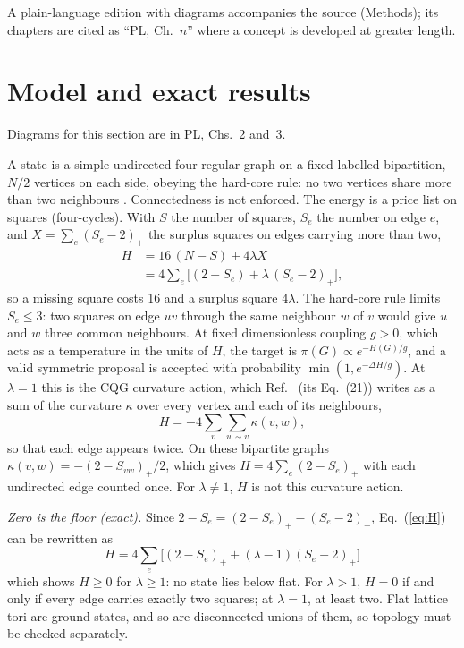 \documentclass[aps,pre,10pt,twocolumn,superscriptaddress,nofootinbib]{revtex4-2}
\begin{document}
A plain-language edition with diagrams accompanies the source (Methods); its chapters are cited as
``PL, Ch.~$n$'' where a concept is developed at greater length.

\section{Model and exact results}
\label{sec:model}

Diagrams for this section are in PL, Chs.~2 and~3.

A state is a simple undirected four-regular graph on a fixed labelled bipartition, $N/2$ vertices on
each side, obeying the hard-core rule: no two vertices share more than two neighbours
\cite{KTB19,T25}. Connectedness is not enforced. The energy is a price list on squares (four-cycles).
With $S$ the number of squares, $S_e$ the number on edge $e$, and $X=\sum_e(S_e-2)_+$ the surplus
squares on edges carrying more than two,
\begin{equation}
\begin{aligned}
H &= 16\,(N - S) + 4\lambda X\\
  &= 4 \sum_e \bigl[(2 - S_e) + \lambda\,(S_e - 2)_+\bigr],
\end{aligned}
\label{eq:H}
\end{equation}
so a missing square costs 16 and a surplus square $4\lambda$. The hard-core rule limits $S_e\le3$: two
squares on edge $uv$ through the same neighbour $w$ of $v$ would give $u$ and $w$ three common neighbours.
At fixed dimensionless coupling $g>0$, which acts as a temperature in the units of $H$, the target is
$\pi(G)\propto e^{-H(G)/g}$, and a valid symmetric proposal is accepted with probability
$\min(1,e^{-\Delta H/g})$. At $\lambda=1$ this is the CQG curvature action, which Ref.~\cite{T25}
(its Eq.~(21)) writes as a sum of the curvature $\kappa$ over every vertex and each of its neighbours,
\[
H=-4\sum_v\sum_{w\sim v}\kappa(v,w),
\]
so that each edge appears twice. On these bipartite graphs $\kappa(v,w)=-(2-S_{vw})_+/2$, which gives
$H=4\sum_e(2-S_e)_+$ with each undirected edge counted once. For $\lambda\ne1$, $H$ is not this
curvature action.

\emph{Zero is the floor (exact).} Since $2-S_e=(2-S_e)_+-(S_e-2)_+$, Eq.~(\ref{eq:H}) can be rewritten as
\[
H=4\sum_e\bigl[(2-S_e)_+ +(\lambda-1)(S_e-2)_+\bigr]
\]
which shows $H\ge0$ for $\lambda\ge1$: no state lies below flat. For $\lambda>1$, $H=0$ if and only if every
edge carries exactly two squares; at $\lambda=1$, at least two. Flat lattice tori are ground states,
and so are disconnected unions of them, so topology must be checked separately.
\end{document}
